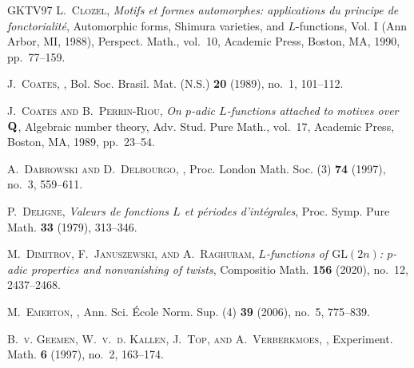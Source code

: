 \documentclass[10pt,reqno,a4paper]{amsart}
\begin{document}
\begin{thebibliography}{GKTV97}
\textsc{L.~Clozel}, \emph{Motifs et formes automorphes: applications du
  principe de fonctorialit\'{e}}, Automorphic forms, {S}himura varieties, and
  {$L$}-functions, {V}ol. {I} ({A}nn {A}rbor, {MI}, 1988), Perspect. Math.,
  vol.~10, Academic Press, Boston, MA, 1990, pp.~77--159. 

\textsc{J.~Coates},
  , Bol.
  Soc. Brasil. Mat. (N.S.) \textbf{20} (1989), no.~1, 101--112. 

\textsc{J.~Coates and B.~Perrin-Riou}, \emph{On {$p$}-adic {$L$}-functions
  attached to motives over {${\bf Q}$}}, Algebraic number theory, Adv. Stud.
  Pure Math., vol.~17, Academic Press, Boston, MA, 1989, pp.~23--54.

\textsc{A.~Dabrowski and D.~Delbourgo},
  , Proc. London
  Math. Soc. (3) \textbf{74} (1997), no.~3, 559--611. 

\textsc{P.~Deligne}, \emph{Valeurs de fonctions {$L$} et p\'{e}riodes
  d’int\'{e}grales}, Proc. Symp. Pure Math. \textbf{33} (1979), 313--346.

\textsc{M.~Dimitrov, F.~Januszewski, and A.~Raghuram}, \emph{${L}$-functions of
  {$\mathrm{GL}(2n)$}: {$p$}-adic properties and nonvanishing of twists},
  Compositio Math. \textbf{156} (2020), no.~12, 2437--2468.

\textsc{M.~Emerton},
  , Ann. Sci. \'{E}cole Norm. Sup.
  (4) \textbf{39} (2006), no.~5, 775--839. 

\textsc{B.~v. Geemen, W.~v.~d. Kallen, J.~Top, and A.~Verberkmoes},
  , Experiment. Math. \textbf{6} (1997), no.~2, 163--174.


\end{thebibliography}
\end{document}
